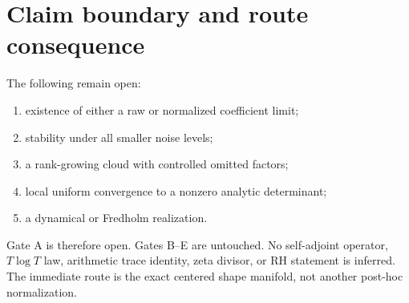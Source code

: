 \documentclass[12pt]{article}
\theoremstyle{remark}\newtheorem{remark}[theorem]{Remark}
\begin{document}
\section{Claim boundary and route consequence}

The following remain open:
\begin{enumerate}[leftmargin=2em]
\item existence of either a raw or normalized coefficient limit;
\item stability under all smaller noise levels;
\item a rank-growing cloud with controlled omitted factors;
\item local uniform convergence to a nonzero analytic determinant;
\item a dynamical or Fredholm realization.
\end{enumerate}

Gate A is therefore open.  Gates B--E are untouched.  No self-adjoint
operator, $T\log T$ law, arithmetic trace identity, zeta divisor, or RH
statement is inferred.  The immediate route is the exact centered shape
manifold, not another post-hoc normalization.


\end{document}
